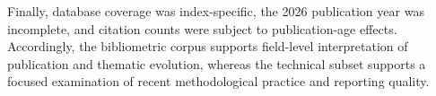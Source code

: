 \documentclass[pdflatex,sn-mathphys-num]{sn-jnl}%
\theoremstyle{thmstyleone}%
\theoremstyle{thmstyletwo}%
\theoremstyle{thmstylethree}%
\begin{document}
Finally, database coverage was index-specific, the 2026 publication year was
incomplete, and citation counts were subject to publication-age effects.
Accordingly, the bibliometric corpus supports field-level interpretation of
publication and thematic evolution, whereas the technical subset supports a
focused examination of recent methodological practice and reporting quality.




\end{document}
